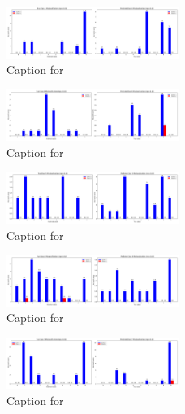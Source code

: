 \documentclass[12pt, a4paper]{article}
\begin{document}
\begin{figure}[ht]
\centering
\includegraphics[width=0.5\textwidth]{combined_class_boundary_pgd/combined_class_4_misclassifications_eps_0.02.png}
\caption{Caption for }
\label{fig:combined_class_4_misclassifications_eps_0.02.png}
\end{figure}

\begin{figure}[ht]
\centering
\includegraphics[width=0.5\textwidth]{combined_class_boundary_pgd/combined_class_6_misclassifications_eps_0.02.png}
\caption{Caption for }
\label{fig:combined_class_6_misclassifications_eps_0.02.png}
\end{figure}

\begin{figure}[ht]
\centering
\includegraphics[width=0.5\textwidth]{combined_class_boundary_pgd/combined_class_5_misclassifications_eps_0.02.png}
\caption{Caption for }
\label{fig:combined_class_5_misclassifications_eps_0.02.png}
\end{figure}

\begin{figure}[ht]
\centering
\includegraphics[width=0.5\textwidth]{combined_class_boundary_pgd/combined_class_8_misclassifications_eps_0.02.png}
\caption{Caption for }
\label{fig:combined_class_8_misclassifications_eps_0.02.png}
\end{figure}

\begin{figure}[ht]
\centering
\includegraphics[width=0.5\textwidth]{combined_class_boundary_pgd/combined_class_7_misclassifications_eps_0.02.png}
\caption{Caption for }
\label{fig:combined_class_7_misclassifications_eps_0.02.png}
\end{figure}
\end{document}
